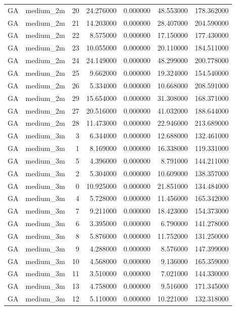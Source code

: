 \begin{tabular}{llrrrrr}
GA & medium_2m & 20 & 24.276000 & 0.000000 & 48.553000 & 178.362000 \\
GA & medium_2m & 21 & 14.203000 & 0.000000 & 28.407000 & 204.590000 \\
GA & medium_2m & 22 & 8.575000 & 0.000000 & 17.150000 & 177.430000 \\
GA & medium_2m & 23 & 10.055000 & 0.000000 & 20.110000 & 184.511000 \\
GA & medium_2m & 24 & 24.149000 & 0.000000 & 48.299000 & 200.778000 \\
GA & medium_2m & 25 & 9.662000 & 0.000000 & 19.324000 & 154.540000 \\
GA & medium_2m & 26 & 5.334000 & 0.000000 & 10.668000 & 208.591000 \\
GA & medium_2m & 29 & 15.654000 & 0.000000 & 31.308000 & 168.371000 \\
GA & medium_2m & 27 & 20.516000 & 0.000000 & 41.032000 & 188.644000 \\
GA & medium_2m & 28 & 11.473000 & 0.000000 & 22.946000 & 213.689000 \\
GA & medium_3m & 3 & 6.344000 & 0.000000 & 12.688000 & 132.461000 \\
GA & medium_3m & 1 & 8.169000 & 0.000000 & 16.338000 & 119.331000 \\
GA & medium_3m & 5 & 4.396000 & 0.000000 & 8.791000 & 144.211000 \\
GA & medium_3m & 2 & 5.304000 & 0.000000 & 10.609000 & 138.357000 \\
GA & medium_3m & 0 & 10.925000 & 0.000000 & 21.851000 & 134.484000 \\
GA & medium_3m & 4 & 5.728000 & 0.000000 & 11.456000 & 165.342000 \\
GA & medium_3m & 7 & 9.211000 & 0.000000 & 18.423000 & 154.373000 \\
GA & medium_3m & 6 & 3.395000 & 0.000000 & 6.790000 & 141.278000 \\
GA & medium_3m & 8 & 5.876000 & 0.000000 & 11.752000 & 131.250000 \\
GA & medium_3m & 9 & 4.288000 & 0.000000 & 8.576000 & 147.399000 \\
GA & medium_3m & 10 & 4.568000 & 0.000000 & 9.136000 & 165.359000 \\
GA & medium_3m & 11 & 3.510000 & 0.000000 & 7.021000 & 144.330000 \\
GA & medium_3m & 13 & 4.758000 & 0.000000 & 9.516000 & 171.345000 \\
GA & medium_3m & 12 & 5.110000 & 0.000000 & 10.221000 & 132.318000 \\

\end{tabular}
